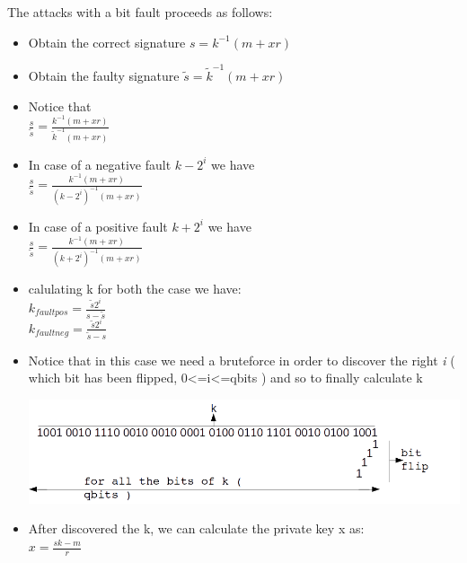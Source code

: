 \documentclass[11pt,english]{article}
\begin{document}
The attacks with a bit fault proceeds as follows: 
\begin{itemize}
\item Obtain the correct signature $s = k^{-1}(m + xr) $
\item Obtain the faulty signature $\tilde{s} = \tilde{k}^{-1}(m + xr)$
\item Notice that \\$\frac{s}{\tilde{s}}  = \frac{k^{-1}(m+xr)}{\tilde{k}^{-1}(m+xr)}$

\item In case of a negative fault $k-2^{i} $ we have\\ $\frac{s}{\tilde{s}} = \frac{k^{-1}(m+xr)}{(k-2^{i})^{-1}(m+xr)}$

\item In case of a positive fault $k+2^{i} $ we have \\$\frac{s}{\tilde{s}} = \frac{k^{-1}(m+xr)}{(k+2^{i})^{-1}(m+xr)}$


\item calulating k for both the case we have: \\$k_{faultpos} = \frac{\tilde{s}2^{i}}{s-\tilde{s}}$ \\
$k_{faultneg} = \frac{\tilde{s}2^{i}}{\tilde{s}-s}$ \\

\item Notice that in this case we need a bruteforce in order to discover the right \textit{i} ( which bit has been flipped, 0<=i<=qbits ) and so to finally calculate k

\includegraphics[width=1.0\textwidth]{img/img_5.png} \\

\item After discovered the k, we can calculate the private key x as:\\ $x = \frac{sk - m}{r}$

\end{itemize}
\end{document}
